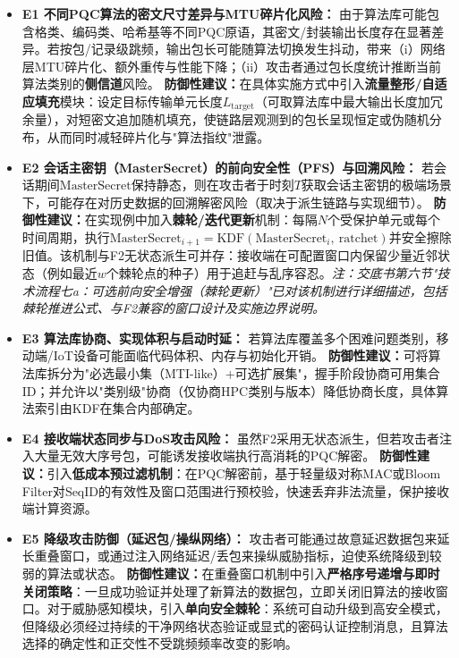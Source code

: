 \documentclass[12pt,a4paper]{article}
\begin{document}
\begin{itemize}[leftmargin=2em]
    \item \textbf{E1 不同PQC算法的密文尺寸差异与MTU碎片化风险：}
    由于算法库可能包含格类、编码类、哈希基等不同PQC原语，其密文/封装输出长度存在显著差异。若按包/记录级跳频，输出包长可能随算法切换发生抖动，带来（i）网络层MTU碎片化、额外重传与性能下降；（ii）攻击者通过包长度统计推断当前算法类别的\textbf{侧信道}风险。
    \textbf{防御性建议：}在具体实施方式中引入\textbf{流量整形/自适应填充}模块：设定目标传输单元长度$L_\text{target}$（可取算法库中最大输出长度加冗余量），对短密文追加随机填充，使链路层观测到的包长呈现恒定或伪随机分布，从而同时减轻碎片化与"算法指纹"泄露。

    \item \textbf{E2 会话主密钥（MasterSecret）的前向安全性（PFS）与回溯风险：}
    若会话期间$\text{MasterSecret}$保持静态，则在攻击者于时刻$T$获取会话主密钥的极端场景下，可能存在对历史数据的回溯解密风险（取决于派生链路与实现细节）。
    \textbf{防御性建议：}在实现例中加入\textbf{棘轮/迭代更新}机制：每隔$N$个受保护单元或每个时间周期，执行$\text{MasterSecret}_{i+1}=\text{KDF}(\text{MasterSecret}_i,\ \text{ratchet})$并安全擦除旧值。该机制与F2无状态派生可并存：接收端在可配置窗口内保留少量近邻状态（例如最近$w$个棘轮点的种子）用于追赶与乱序容忍。\textit{注：交底书第六节"技术流程七a：可选前向安全增强（棘轮更新）"已对该机制进行详细描述，包括棘轮推进公式、与F2兼容的窗口设计及实施边界说明。}

    \item \textbf{E3 算法库协商、实现体积与启动时延：}
    若算法库覆盖多个困难问题类别，移动端/IoT设备可能面临代码体积、内存与初始化开销。
    \textbf{防御性建议：}可将算法库拆分为"必选最小集（MTI-like）+可选扩展集"，握手阶段协商可用集合ID；并允许以"类别级"协商（仅协商HPC类别与版本）降低协商长度，具体算法索引由KDF在集合内部确定。

    \item \textbf{E4 接收端状态同步与DoS攻击风险：}
    虽然F2采用无状态派生，但若攻击者注入大量无效大序号包，可能诱发接收端执行高消耗的PQC解密。
    \textbf{防御性建议：}引入\textbf{低成本预过滤机制}：在PQC解密前，基于轻量级对称MAC或Bloom Filter对$\text{SeqID}$的有效性及窗口范围进行预校验，快速丢弃非法流量，保护接收端计算资源。

    \item \textbf{E5 降级攻击防御（延迟包/操纵网络）：}
    攻击者可能通过故意延迟数据包来延长重叠窗口，或通过注入网络延迟/丢包来操纵威胁指标，迫使系统降级到较弱的算法或状态。
    \textbf{防御性建议：}在重叠窗口机制中引入\textbf{严格序号递增与即时关闭策略}：一旦成功验证并处理了新算法的数据包，立即关闭旧算法的接收窗口。对于威胁感知模块，引入\textbf{单向安全棘轮}：系统可自动升级到高安全模式，但降级必须经过持续的干净网络状态验证或显式的密码认证控制消息，且算法选择的确定性和正交性不受跳频频率改变的影响。
\end{itemize}
\end{document}
